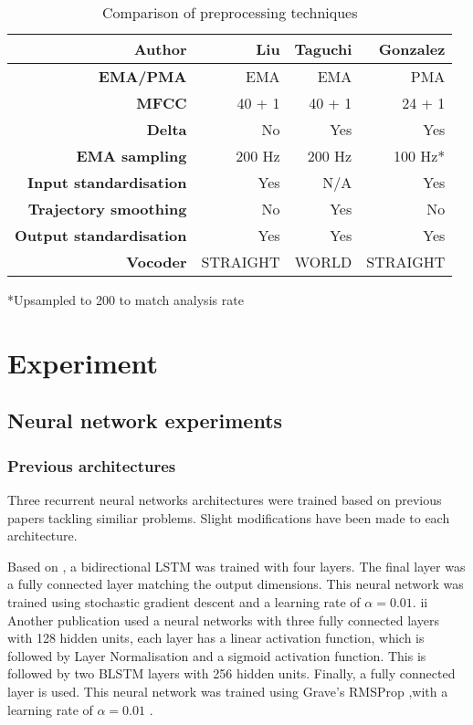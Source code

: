 \documentclass[a4paper]{article}
\begin{document}
\begin{table}[th]
  \caption{Comparison of preprocessing techniques}
  \label{tab:example}
  \centering
  \footnotesize
  \begin{tabular}{ r r r r }
    \toprule
    \textbf{Author} & \textbf{Liu} & \textbf{Taguchi} & \textbf{Gonzalez} \\
    \midrule
    \textbf{EMA/PMA} & EMA & EMA & PMA \\
    \textbf{MFCC} & 40 + 1 & 40 + 1 & 24 + 1 \\
    \textbf{Delta} & No & Yes & Yes \\
    \textbf{EMA sampling} & 200 Hz & 200 Hz & 100 Hz* \\
    \textbf{Input standardisation} & Yes & N/A  & Yes \\
    \textbf{Trajectory smoothing} & No & Yes  & No \\
    \textbf{Output standardisation} & Yes & Yes & Yes \\
    \textbf{Vocoder} & STRAIGHT \cite{Kawahara2006} & WORLD  & STRAIGHT \cite{Kawahara2006} \\
    \bottomrule
  \end{tabular}
  *Upsampled to 200 to match analysis rate
\end{table}

\section{Experiment}

\subsection{Neural network experiments} \label{nnexperiment}

\subsubsection{Previous architectures}
Three recurrent neural networks architectures were trained based on previous
papers tackling similiar problems. Slight modifications have been made to each
architecture.


Based on \cite{Liu2018}, a bidirectional LSTM was trained with four layers.
The final layer was a fully connected layer matching the output dimensions.
This neural network was trained using stochastic gradient descent and
a learning rate of \( \alpha = 0.01 \).
ii
Another publication \cite{Taguchi} used a neural networks with three fully
connected layers with 128 hidden units, each layer has a linear activation
function, which is followed by Layer Normalisation and a sigmoid activation
function. This is followed by two BLSTM layers with 256 hidden units. Finally,
a fully connected layer is used. This neural network was trained using Grave's RMSProp \cite{Graves2013},with a learning rate of \( \alpha = 0.01 \) .
\end{document}
